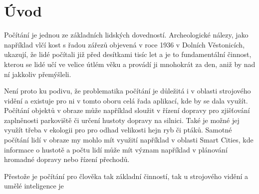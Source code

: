 \chapter{Úvod}
\label{sec:Introduction}
Počítání je jednou ze základních lidských dovedností.
Archeologické nálezy, jako například vlčí kost s řadou zářezů objevená v roce 1936 v Dolních Věstonicích, ukazují, že lidé počítali již před desítkami tisíc let a je to fundamentální činnost, kterou se lidé učí ve velice útlém věku a provádí ji mnohokrát za den, aniž by nad ní jakkoliv přemýšleli.

Není proto ku podivu, že problematika počítání je důležitá i v oblasti strojového vidění a existuje pro ni v tomto oboru celá řada aplikací, kde by se dala využít.
Počítání objektů v obraze může například sloužit v řízení dopravy pro zjišťování zaplněnosti parkoviště či určení hustoty dopravy na silnici. Také je možné jej využít třeba v ekologii pro pro odhad velikosti hejn ryb či ptáků.
Samotné počítání lidí v obraze my mohlo mít využití například v oblasti Smart Cities, kde informace o hustotě a počtu lidí může mít význam například v plánování hromadné dopravy nebo řízení přechodů.

Přestože je počítání pro člověka tak základní činností, tak u strojového vidění a umělé inteligence je 

\endinput